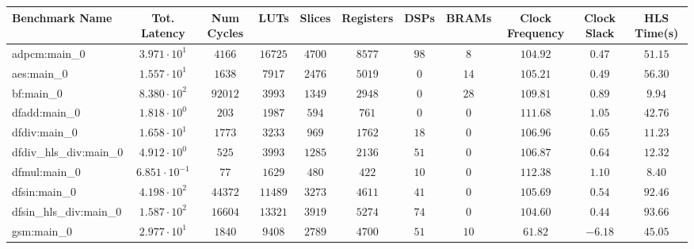 \begin{tabular}{|l|c|c|c|c|c|c|c|c|c|c|}
\hline
Benchmark Name          & Tot. Latency            & Num Cycles & LUTs       & Slices    & Registers & DSPs    & BRAMs   & Clock Frequency & Clock Slack & HLS Time(s) \\
\hline
adpcm:main\_0           & $ 3.971 \cdot 10^{1}  $ & $ 4166   $ & $ 16725  $ & $ 4700  $ & $ 8577  $ & $ 98  $ & $ 8   $ & $ 104.92      $ & $ 0.47    $ & $ 51.15   $ \\
aes:main\_0             & $ 1.557 \cdot 10^{1}  $ & $ 1638   $ & $ 7917   $ & $ 2476  $ & $ 5019  $ & $ 0   $ & $ 14  $ & $ 105.21      $ & $ 0.49    $ & $ 56.30   $ \\
bf:main\_0              & $ 8.380 \cdot 10^{2}  $ & $ 92012  $ & $ 3993   $ & $ 1349  $ & $ 2948  $ & $ 0   $ & $ 28  $ & $ 109.81      $ & $ 0.89    $ & $ 9.94    $ \\
dfadd:main\_0           & $ 1.818 \cdot 10^{0}  $ & $ 203    $ & $ 1987   $ & $ 594   $ & $ 761   $ & $ 0   $ & $ 0   $ & $ 111.68      $ & $ 1.05    $ & $ 42.76   $ \\
dfdiv:main\_0           & $ 1.658 \cdot 10^{1}  $ & $ 1773   $ & $ 3233   $ & $ 969   $ & $ 1762  $ & $ 18  $ & $ 0   $ & $ 106.96      $ & $ 0.65    $ & $ 11.23   $ \\
dfdiv\_hls\_div:main\_0 & $ 4.912 \cdot 10^{0}  $ & $ 525    $ & $ 3993   $ & $ 1285  $ & $ 2136  $ & $ 51  $ & $ 0   $ & $ 106.87      $ & $ 0.64    $ & $ 12.32   $ \\
dfmul:main\_0           & $ 6.851 \cdot 10^{-1} $ & $ 77     $ & $ 1629   $ & $ 480   $ & $ 422   $ & $ 10  $ & $ 0   $ & $ 112.38      $ & $ 1.10    $ & $ 8.40    $ \\
dfsin:main\_0           & $ 4.198 \cdot 10^{2}  $ & $ 44372  $ & $ 11489  $ & $ 3273  $ & $ 4611  $ & $ 41  $ & $ 0   $ & $ 105.69      $ & $ 0.54    $ & $ 92.46   $ \\
dfsin\_hls\_div:main\_0 & $ 1.587 \cdot 10^{2}  $ & $ 16604  $ & $ 13321  $ & $ 3919  $ & $ 5274  $ & $ 74  $ & $ 0   $ & $ 104.60      $ & $ 0.44    $ & $ 93.66   $ \\
gsm:main\_0             & $ 2.977 \cdot 10^{1}  $ & $ 1840   $ & $ 9408   $ & $ 2789  $ & $ 4700  $ & $ 51  $ & $ 10  $ & $ 61.82       $ & $ -6.18   $ & $ 45.05   $ \\

\end{tabular}
